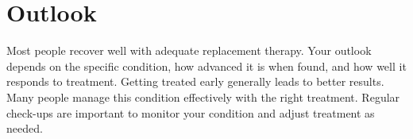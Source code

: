 \section{Outlook}
Most people recover well with adequate replacement therapy. Your outlook depends on the specific condition, how advanced it is when found, and how well it responds to treatment. Getting treated early generally leads to better results. Many people manage this condition effectively with the right treatment. Regular check-ups are important to monitor your condition and adjust treatment as needed.
